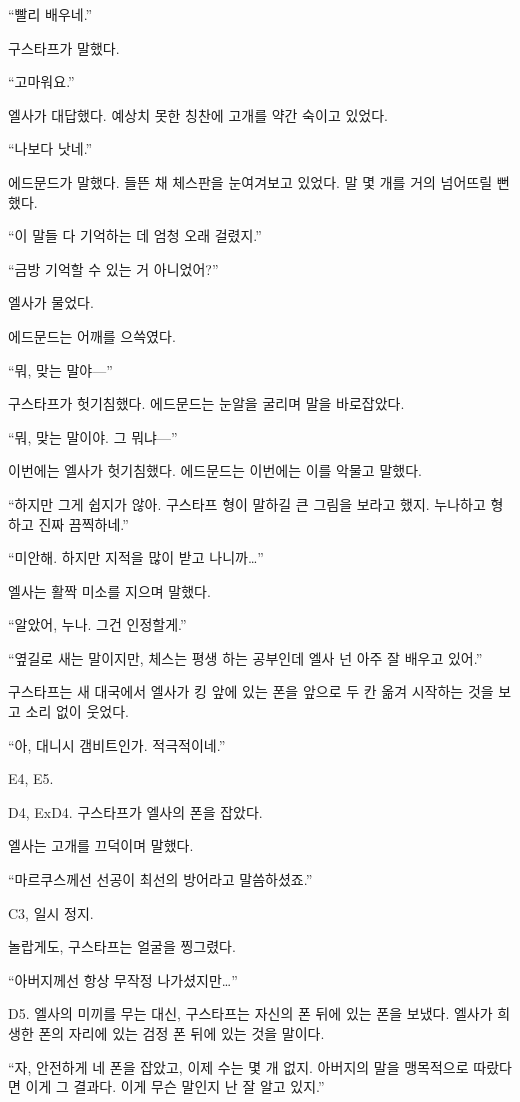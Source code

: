 ``빨리 배우네.''

구스타프가 말했다.

``고마워요.''

엘사가 대답했다. 예상치 못한 칭찬에 고개를 약간 숙이고 있었다.

``나보다 낫네.''

에드문드가 말했다. 들뜬 채 체스판을 눈여겨보고 있었다. 말 몇 개를 거의 넘어뜨릴 뻔했다.

``이 말들 다 기억하는 데 엄청 오래 걸렸지.''

``금방 기억할 수 있는 거 아니었어?''

엘사가 물었다.

에드문드는 어깨를 으쓱였다.

``뭐, 맞는 말야—''

구스타프가 헛기침했다. 에드문드는 눈알을 굴리며 말을 바로잡았다.

``뭐, 맞는 말이야. 그 뭐냐—''

이번에는 엘사가 헛기침했다. 에드문드는 이번에는 이를 악물고 말했다.

``하지만 그게 쉽지가 않아. 구스타프 형이 말하길 큰 그림을 보라고 했지. 누나하고 형하고 진짜 끔찍하네.''

``미안해. 하지만 지적을 많이 받고 나니까\ldots''

엘사는 활짝 미소를 지으며 말했다.

``알았어, 누나. 그건 인정할게.''

``옆길로 새는 말이지만, 체스는 평생 하는 공부인데 엘사 넌 아주 잘 배우고 있어.''

구스타프는 새 대국에서 엘사가 킹 앞에 있는 폰을 앞으로 두 칸 옮겨 시작하는 것을 보고 소리 없이 웃었다.

``아, 대니시 갬비트인가. 적극적이네.''

E4, E5.

D4, ExD4. 구스타프가 엘사의 폰을 잡았다.

엘사는 고개를 끄덕이며 말했다.

``마르쿠스께선 선공이 최선의 방어라고 말씀하셨죠.''

C3, 일시 정지.

놀랍게도, 구스타프는 얼굴을 찡그렸다.

``아버지께선 항상 무작정 나가셨지만\ldots''

D5. 엘사의 미끼를 무는 대신, 구스타프는 자신의 폰 뒤에 있는 폰을 보냈다. 엘사가 희생한 폰의 자리에 있는 검정 폰 뒤에 있는 것을 말이다.

``자, 안전하게 네 폰을 잡았고, 이제 수는 몇 개 없지. 아버지의 말을 맹목적으로 따랐다면 이게 그 결과다. 이게 무슨 말인지 난 잘 알고 있지.''

